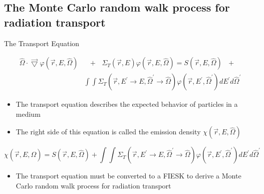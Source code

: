 \documentclass{beamer}
\begin{document}
\subsection{The Monte Carlo random walk process for radiation transport}
\begin{frame}{The Transport Equation}

\begin{align}
  \hat{\Omega} \cdot \vec{\bigtriangledown} \varphi(\vec{r},E,\hat{\Omega})
    &\text{ }+\text{ } \Sigma_T(\vec{r},E) \varphi(\vec{r},E,\hat{\Omega}) = 
    S(\vec{r},E,\hat{\Omega}) \text{ }+\text{ } \nonumber \\
    & \int\int \Sigma_T(\vec{r},E^{'} \to E,\hat{\Omega}^{'} \to \hat{\Omega})
    \varphi(\vec{r},E^{'},\hat{\Omega}^{'}) dE^{'}d\hat{\Omega}^{'} \nonumber
\end{align}

  \begin{itemize}
    \item The transport equation describes the expected behavior of particles
      in a medium
      \medskip
    \item The right side of this equation is called the emission density 
      $\chi(\vec{r},E,\hat{\Omega})$
  \end{itemize}
  \medskip
  \begin{equation*}
    \chi(\vec{r},E,\hat{\Omega}) = S(\vec{r},E,\hat{\Omega}) +
    \int\int \Sigma_T(\vec{r},E^{'} \to E,\hat{\Omega}^{'} \to \hat{\Omega})
    \varphi(\vec{r},E^{'},\hat{\Omega}^{'}) dE^{'}d\hat{\Omega}^{'}
  \end{equation*}
  
  \begin{itemize}
    \item The transport equation must be converted to a FIESK to derive a 
      Monte Carlo random walk process for radiation transport
  \end{itemize}

\end{frame}

\end{document}
